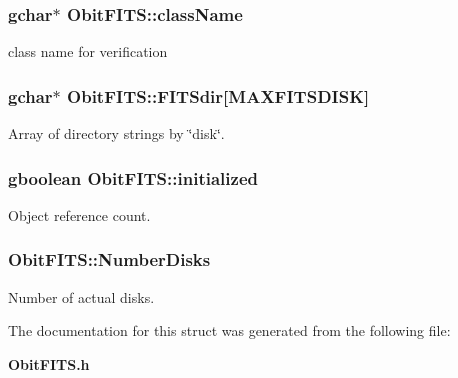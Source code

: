 \subsubsection{\setlength{\rightskip}{0pt plus 5cm}gchar$\ast$ {\bf Obit\-FITS::class\-Name}}\label{structObitFITS_o0}


class name for verification 

\subsubsection{\setlength{\rightskip}{0pt plus 5cm}gchar$\ast$ {\bf Obit\-FITS::FITSdir}[MAXFITSDISK]}\label{structObitFITS_o2}


Array of directory strings by \char`\"{}disk\char`\"{}. 

\subsubsection{\setlength{\rightskip}{0pt plus 5cm}gboolean {\bf Obit\-FITS::initialized}}\label{structObitFITS_o1}


Object reference count. 

\subsubsection{ {\bf Obit\-FITS::Number\-Disks}}\label{structObitFITS_o3}


Number of actual disks. 



The documentation for this struct was generated from the following file:\begin{CompactItemize}
\item 
{\bf Obit\-FITS.h}\end{CompactItemize}

